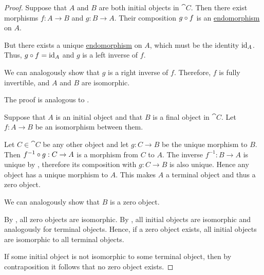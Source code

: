 \begin{proof}
   Suppose that \( A \) and \( B \) are both initial objects in \( \cat{C} \). Then there exist morphisms \( f: A \to B \) and \( g: B \to A \). Their composition \( g \mathbin \circ f \) is an \hyperref[def:morphism_invertibility/endomorphism]{endomorphism} on \( A \).

  But there exists a unique \hyperref[def:morphism_invertibility/endomorphism]{endomorphism} on \( A \), which must be the identity \( \operatorname{id}_A \). Thus, \( g \mathbin \circ f = \operatorname{id}_A \) and \( g \) is a left inverse of \( f \).

  We can analogously show that \( g \) is a right inverse of \( f \). Therefore, \( f \) is fully invertible, and \( A \) and \( B \) are isomorphic.

   The proof is analogous to .

   Suppose that \( A \) is an initial object and that \( B \) is a final object in \( \cat{C} \). Let \( f: A \to B \) be an isomorphism between them.

  Let \( C \in \cat{C} \) be any other object and let \( g: C \to B \) be the unique morphism to \( B \). Then \( f^{-1} \mathbin \circ g: C \to A \) is a morphism from \( C \) to \( A \). The inverse \( f^{-1}: B \to A \) is unique by , therefore its composition with \( g: C \to B \) is also unique. Hence any object has a unique morphism to \( A \). This makes \( A \) a terminal object and thus a zero object.

  We can analogously show that \( B \) is a zero object.

   By , all zero objects are isomorphic. By , all initial objects are isomorphic and analogously for terminal objects. Hence, if a zero object exists, all initial objects are isomorphic to all terminal objects.

  If some initial object is not isomorphic to some terminal object, then by contraposition it follows that no zero object exists.
\end{proof}

